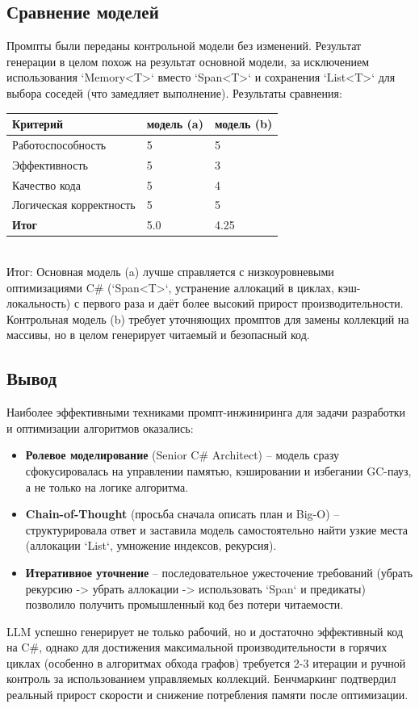 \subsection{Сравнение моделей}
Промпты были переданы контрольной модели без изменений.
Результат генерации в целом похож на результат основной модели, за исключением использования `Memory<T>` вместо `Span<T>` и сохранения `List<T>` для выбора соседей (что замедляет выполнение).
\newpage
Результаты сравнения:
\begin{table}[h!]
\centering
\begin{tabular}{|l|p{5cm}|p{5cm}|}
\hline
\textbf{Критерий} & \textbf{модель (a)} & \textbf{модель (b)} \\
\hline
Работоспособность & 5 & 5 \\
\hline
Эффективность & 5 & 3\\
\hline
Качество кода & 5 & 4 \\
\hline
Логическая корректность & 5 & 5 \\
\hline
\textbf{Итог} & 5.0 & 4.25\\
\hline
\end{tabular}
\end{table} \\
Итог: Основная модель (a) лучше справляется с низкоуровневыми оптимизациями C\# (`Span<T>`, устранение аллокаций в циклах, кэш-локальность) с первого раза и даёт более высокий прирост производительности. Контрольная модель (b) требует уточняющих промптов для замены коллекций на массивы, но в целом генерирует читаемый и безопасный код.

\subsection{Вывод}
Наиболее эффективными техниками промпт-инжиниринга для задачи разработки и оптимизации алгоритмов оказались:
\begin{itemize}
\item \textbf{Ролевое моделирование} (Senior C\# Architect) – модель сразу сфокусировалась на управлении памятью, кэшировании и избегании GC-пауз, а не только на логике алгоритма.
\item \textbf{Chain-of-Thought} (просьба сначала описать план и Big-O) – структурировала ответ и заставила модель самостоятельно найти узкие места (аллокации `List`, умножение индексов, рекурсия).
\item \textbf{Итеративное уточнение} – последовательное ужесточение требований (убрать рекурсию -> убрать аллокации -> использовать `Span` и предикаты) позволило получить промышленный код без потери читаемости.
\end{itemize}
LLM успешно генерирует не только рабочий, но и достаточно эффективный код на C\#, однако для достижения максимальной производительности в горячих циклах (особенно в алгоритмах обхода графов) требуется 2-3 итерации и ручной контроль за использованием управляемых коллекций. Бенчмаркинг подтвердил реальный прирост скорости и снижение потребления памяти после оптимизации.